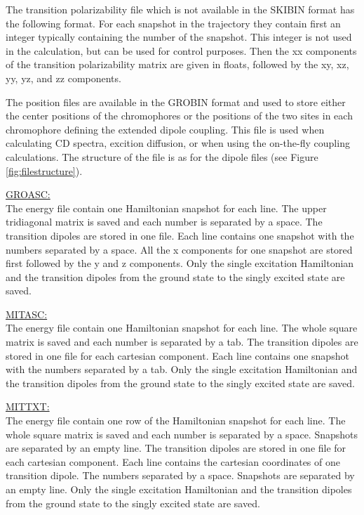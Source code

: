 The transition polarizability file which is not available in the SKIBIN format 
has the following format. For each snapshot in the trajectory they contain first an
integer typically containing the number of the snapshot. This integer is not used in
the calculation,  but can be used for control purposes. Then the xx components of the
transition polarizability matrix are given in floats, followed by the xy, xz, yy, yz,
and zz components. 

The position files are available in the GROBIN format and used to store either the
center positions of the chromophores or the positions of the two sites in each
chromophore defining the extended dipole coupling. This file is used when calculating
CD spectra, excition diffusion, or when using the on-the-fly coupling calculations.
The structure of the file is as for the dipole files (see Figure
\ref{fig:filestructure}).

\noindent
\underline{GROASC:}\\
The energy file contain one Hamiltonian snapshot for each line. The upper tridiagonal
matrix is saved and each number is separated by a space. The transition dipoles are
stored in one file. Each line contains one snapshot with the numbers separated by a
space. All the x components for one snapshot are stored first followed by the y and z
components. Only the single excitation Hamiltonian and the transition dipoles from the
ground state to the singly excited state are saved.

\noindent
\underline{MITASC:}\\
The energy file contain one Hamiltonian snapshot for each line. The whole square matrix
is saved and each number is separated by a tab. The transition dipoles are stored in
one file for each cartesian component. Each line contains one snapshot with the numbers
separated by a tab. Only the single excitation Hamiltonian and the transition dipoles
from the ground state to the singly excited state are saved.

\noindent
\underline{MITTXT:}\\
The energy file contain one row of the Hamiltonian snapshot for each line. The whole
square matrix is saved and each number is separated by a space. Snapshots are separated
by an empty line. The transition dipoles are stored in one file for each cartesian
component. Each line contains the cartesian coordinates of one transition dipole.
The numbers separated by a space. Snapshots are separated by an empty line. Only the
single excitation Hamiltonian and the transition dipoles from the ground state to the
singly excited state are saved.


